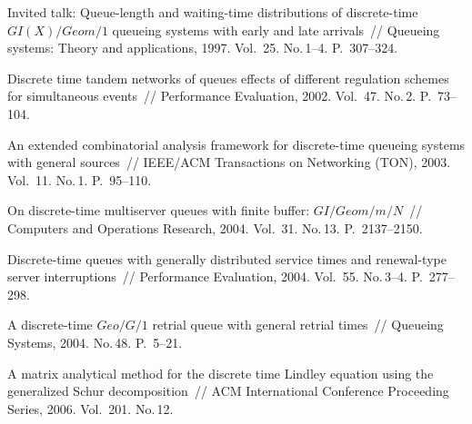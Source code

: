 \begin{multicols}{2}
{{\begin{thebibliography}{99}
Invited talk: Queue-length and waiting-time distributions of discrete-time
$GI(X)/Geom/1$ queueing systems with early and late arrivals~//
Queueing systems: Theory and applications,
1997. Vol.~25. No.\,1--4. P.~307--324.

Discrete time tandem networks of queues effects of different regulation
schemes for simultaneous events~//
Performance Evaluation, 2002. Vol.~47. No.\,2. P.~73--104.

An extended combinatorial analysis framework for discrete-time queueing
systems with general sources~//
IEEE/ACM Transactions on Networking (TON), 2003. Vol.~11. No.\,1. P.~95--110.

On discrete-time multiserver queues with finite buffer: $GI/Geom/m/N$~//
Computers and Operations Research, 2004. Vol.~31. No.\,13. P.~2137--2150.

Discrete-time queues with generally distributed service times and
renewal-type server interruptions~//
Performance Evaluation, 2004. Vol.~55. No.\,3--4. P.~277--298.

A discrete-time $Geo/G/1$ retrial queue with general retrial times~//
Queueing Systems, 2004. No.\,48. P.~5--21.

A matrix analytical method for the discrete time Lindley equation using
the generalized Schur decomposition~//
ACM International Conference Proceeding Series, 2006.
Vol.~201. No.\,12.

\end{thebibliography}
\label{end\stat}
} 
}
\end{multicols}
